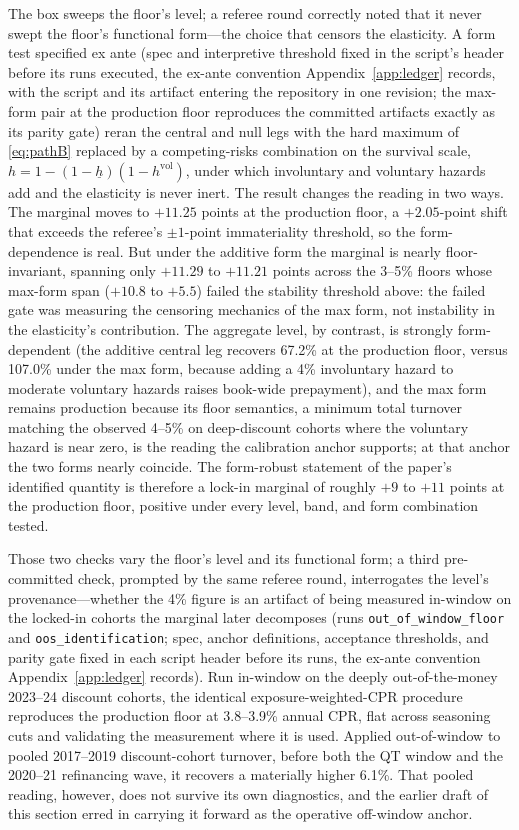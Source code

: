 \documentclass[12pt]{article}
\begin{document}
The box sweeps the floor's level; a referee round correctly noted that it never swept the floor's functional form---the choice that censors the elasticity. A form test specified ex ante (spec and interpretive threshold fixed in the script's header before its runs executed, the ex-ante convention Appendix~\ref{app:ledger} records, with the script and its artifact entering the repository in one revision; the max-form pair at the production floor reproduces the committed artifacts exactly as its parity gate) reran the central and null legs with the hard maximum of \eqref{eq:pathB} replaced by a competing-risks combination on the survival scale, $h = 1 - (1 - \underline{h})(1 - h^{\mathrm{vol}})$, under which involuntary and voluntary hazards add and the elasticity is never inert. The result changes the reading in two ways. The marginal moves to $+11.25$ points at the production floor, a $+2.05$-point shift that exceeds the referee's $\pm 1$-point immateriality threshold, so the form-dependence is real. But under the additive form the marginal is nearly floor-invariant, spanning only $+11.29$ to $+11.21$ points across the 3--5\% floors whose max-form span ($+10.8$ to $+5.5$) failed the stability threshold above: the failed gate was measuring the censoring mechanics of the max form, not instability in the elasticity's contribution. The aggregate level, by contrast, is strongly form-dependent (the additive central leg recovers 67.2\% at the production floor, versus 107.0\% under the max form, because adding a 4\% involuntary hazard to moderate voluntary hazards raises book-wide prepayment), and the max form remains production because its floor semantics, a minimum total turnover matching the observed 4--5\% on deep-discount cohorts where the voluntary hazard is near zero, is the reading the calibration anchor supports; at that anchor the two forms nearly coincide. The form-robust statement of the paper's identified quantity is therefore a lock-in marginal of roughly $+9$ to $+11$ points at the production floor, positive under every level, band, and form combination tested.

Those two checks vary the floor's level and its functional form; a third pre-committed check, prompted by the same referee round, interrogates the level's provenance---whether the 4\% figure is an artifact of being measured in-window on the locked-in cohorts the marginal later decomposes (runs \texttt{out\_of\_window\_floor} and \texttt{oos\_identification}; spec, anchor definitions, acceptance thresholds, and parity gate fixed in each script header before its runs, the ex-ante convention Appendix~\ref{app:ledger} records). Run in-window on the deeply out-of-the-money 2023--24 discount cohorts, the identical exposure-weighted-CPR procedure reproduces the production floor at 3.8--3.9\% annual CPR, flat across seasoning cuts and validating the measurement where it is used. Applied out-of-window to pooled 2017--2019 discount-cohort turnover, before both the QT window and the 2020--21 refinancing wave, it recovers a materially higher 6.1\%. That pooled reading, however, does not survive its own diagnostics, and the earlier draft of this section erred in carrying it forward as the operative off-window anchor.
\end{document}

